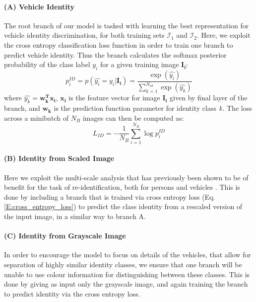 \documentclass[10pt,twocolumn,letterpaper]{article}
\begin{document}
\paragraph{(A) Vehicle Identity}

The root branch of our model is tasked with learning the best representation for vehicle identity discrimination, for both training sets $\mathcal{I}_1$ and $\mathcal{I}_2$.
Here, we exploit the cross entropy classification loss function in order to train one branch to predict vehicle identity. Thus the branch calculates the softmax posterior probability of the class label $y_i$ for a given training image $\mathbf{I_i}$:
\begin{equation}
  p_i^{ID} = p(\hat{y_i} = y_i|\mathbf{I_i}) = \frac{\exp(\hat{y_i})}{\sum_{k=1}^{N_{id}}\exp(\hat{y_k})}
  \label{E:softmax_id}
\end{equation}
where $\hat{y_k} = \mathbf{w_k^Tx_i}$, $\mathbf{x_i}$ is the feature vector for image $\mathbf{I_i}$ given by final layer of the branch, and $\mathbf{w_k}$ is the prediction function parameter for identity class $\emph{k}$. The loss across a minibatch of $N_B$ images can then be computed as:
\begin{equation}
  L_{ID} = -\frac{1}{N_B} \sum_{i=1}^{N_B} \log{p_i^{ID}}
  \label{E:cross_entropy_loss}
\end{equation}

\paragraph{(B) Identity from Scaled Image}

Here we exploit the multi-scale analysis that has previously been shown to be of benefit for the task of re-identification, both for persons \cite{chen2017person} and vehicles \cite{kanaci2018vehicle}. This is done by including a branch that is trained via cross entropy loss (Eq. \ref{E:cross_entropy_loss}) to predict the class identity from a rescaled version of the input image, in a similar way to branch A.

\paragraph{(C) Identity from Grayscale Image}

In order to encourage the model to focus on details of the vehicles,
that allow for separation of highly similar identity classes, we
ensure that one branch will be unable to use colour information for
distinguishing between these classes. This is done by giving as input
only the grayscale image, and again training the branch to predict
identity via the cross entropy loss.
\end{document}
